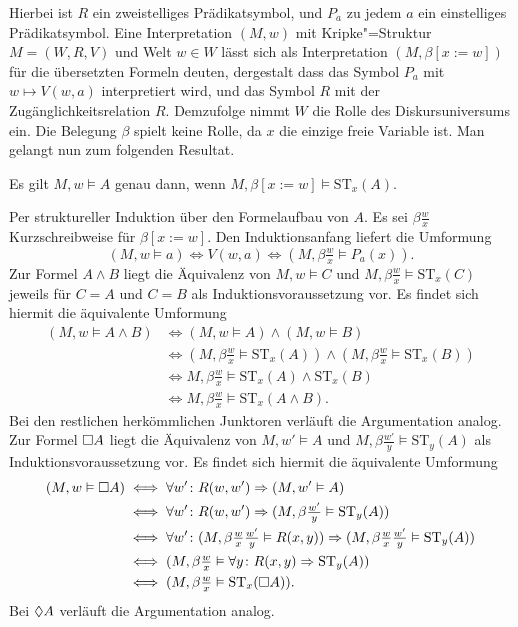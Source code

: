 Hierbei ist $R$ ein zweistelliges Prädikatsymbol, und $P_a$ zu
jedem $a$ ein einstelliges Prädikatsymbol. Eine Interpretation
$(M,w)$ mit Kripke"=Struktur $M=(W,R,V)$ und Welt $w\in W$
lässt sich als Interpretation $(M,\beta[x:=w])$ für die übersetzten
Formeln deuten, dergestalt dass das Symbol $P_a$ mit $w\mapsto V(w,a)$
interpretiert wird, und das Symbol $R$ mit der Zugänglichkeitsrelation
$R$. Demzufolge nimmt $W$ die Rolle des Diskursuniversums ein.
Die Belegung $\beta$ spielt keine Rolle, da $x$ die einzige freie
Variable ist. Man gelangt nun zum folgenden Resultat.
\begin{Satz}
Es gilt $M,w\models A$ genau dann, wenn $M,\beta[x:=w]\models\mathrm{ST}_x(A)$.
\end{Satz}
\begin{Beweis}
Per struktureller Induktion über den Formelaufbau von $A$.
Es sei $\beta\tfrac{w}{x}$ Kurzschreibweise für $\beta[x:=w]$. Den
Induktionsanfang liefert die Umformung
\[(M,w\models a) \iff V(w,a) \iff (M,\beta\tfrac{w}{x}\models P_a(x)).\]
Zur Formel $A\land B$ liegt die Äquivalenz von $M,w\models C$
und $M,\beta\tfrac{w}{x}\models\mathrm{ST}_x(C)$ jeweils für $C=A$
und $C=B$ als Induktionsvoraussetzung vor. Es findet sich hiermit
die äquivalente Umformung
\begin{align*}
(M,w\models A\land B) &\iff (M,w\models A)\land (M,w\models B)\\
&\iff (M,\beta\tfrac{w}{x}\models\mathrm{ST}_x(A))\land
(M,\beta\tfrac{w}{x}\models\mathrm{ST}_x(B))\\
&\iff M,\beta\tfrac{w}{x}\models\mathrm{ST}_x(A)\land\mathrm{ST}_x(B)\\
&\iff M,\beta\tfrac{w}{x}\models\mathrm{ST}_x(A\land B).
\end{align*}
Bei den restlichen herkömmlichen Junktoren verläuft die Argumentation
analog. Zur Formel $\Box A$ liegt die Äquivalenz von $M,w'\models A$
und $M,\beta\tfrac{w'}{y}\models\mathrm{ST}_y(A)$ als
Induktionsvoraussetzung vor. Es findet sich hiermit die äquivalente
Umformung
\begin{align*}
(M,w\vDash\Box A) &\iff \forall w'\colon R(w,w')\Rightarrow (M,w'\vDash A)\\
&\iff\forall w'\colon R(w,w')\Rightarrow (M,\beta\tfrac{w'}{y}\vDash\mathrm{ST}_y(A))\\
&\iff\forall w'\colon (M,\beta\tfrac{w}{x}\tfrac{w'}{y}\vDash R(x,y))
\Rightarrow (M,\beta\tfrac{w}{x}\tfrac{w'}{y}\vDash\mathrm{ST}_y(A))\\
&\iff (M,\beta\tfrac{w}{x}\vDash\forall y\colon R(x,y)\Rightarrow\mathrm{ST}_y(A))\\
&\iff (M,\beta\tfrac{w}{x}\vDash\mathrm{ST}_x(\Box A)).
\end{align*}
Bei $\Diamond A$ verläuft die Argumentation analog.\,\qedsymbol
\end{Beweis}

